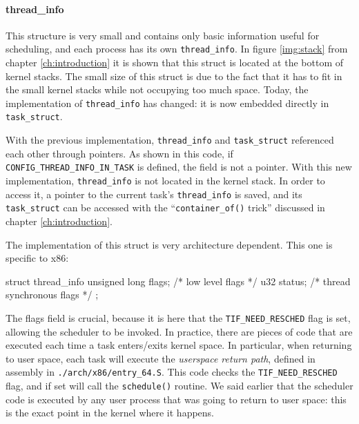 \paragraph{thread\_info}
\label{sec:thread_info}
This structure is very small and contains only basic information useful for scheduling, and each process has its own \verb|thread_info|. In figure \ref{img:stack} from chapter \ref{ch:introduction} it is shown that this struct is located at the bottom of kernel stacks. The small size of this struct is due to the fact that it has to fit in the small kernel stacks while not occupying too much space. Today, the implementation of \verb|thread_info| has changed: it is now embedded directly in \verb|task_struct|. 

\begin{code}
struct task_struct {
#ifdef CONFIG_THREAD_INFO_IN_TASK
	/*
	 * For reasons of header soup (see current_thread_info()), this
	 * must be the first element of task_struct.
	 */
	struct thread_info  thread_info;
#endif
// ...
\end{code}
With the previous implementation, \verb|thread_info| and \verb|task_struct| referenced each other through pointers. As shown in this code, if \verb|CONFIG_THREAD_INFO_IN_TASK| is defined, the field is not a pointer. With this new implementation, \verb|thread_info| is not located in the kernel stack. In order to access it, a pointer to the current task's \verb|thread_info| is saved, and its \verb|task_struct| can be accessed with the ``\verb|container_of()| trick'' discussed in chapter \ref{ch:introduction}. 

The implementation of this struct is very architecture dependent. This one is specific to x86:
\begin{code}
struct thread_info {
	unsigned long   flags;  /* low level flags */
	u32 status;             /* thread synchronous flags */
};
\end{code}
The flags field is crucial, because it is here that the \verb|TIF_NEED_RESCHED| flag is set, allowing the scheduler to be invoked. In practice, there are pieces of code that are executed each time a task enters/exits kernel space. In particular, when returning to user space, each task will execute the \textit{userspace return path}, defined in assembly in \verb|./arch/x86/entry_64.S|. This code checks the \verb|TIF_NEED_RESCHED| flag, and if set will call the \verb|schedule()| routine. We said earlier that the scheduler code is executed by any user process that was going to return to user space: this is the exact point in the kernel where it happens.

